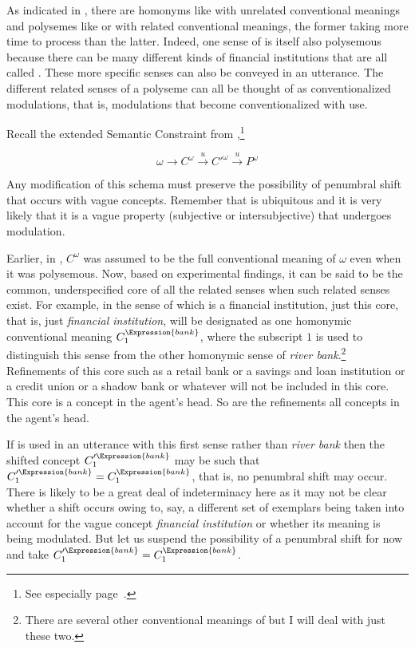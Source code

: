 As indicated in , there are homonyms like  with unrelated conventional meanings and polysemes like  or  with related conventional meanings, the former taking more time to process than the latter. Indeed, one sense of  is itself also polysemous because there can be many different kinds of financial institutions that are all called . These more specific senses can also be conveyed in an utterance. The different related senses of a polyseme can all be thought of as conventionalized modulations, that is, modulations that become conventionalized with use.

Recall the extended Semantic Constraint from ,\footnote{See especially page~\pageref{page:vague communication}.}


\[ \omega \longrightarrow C^{\omega} \stackrel{u}\longrightarrow C'^{\omega} \stackrel{u}\longrightarrow P^\omega \]

Any modification of this schema must preserve the possibility of penumbral shift that occurs with vague concepts. Remember that  is ubiquitous and it is very likely that it is a vague property (subjective or intersubjective) that undergoes modulation. 

Earlier, in , $C^{\omega}$ was assumed to be the full conventional meaning of $\omega$ even when it was polysemous. Now, based on  experimental findings, it can be said to be the common, underspecified core of all the related senses when such related senses exist. For example, in the sense of  which is a financial institution, just this core, that is, just \emph{financial institution}, will be designated as one homonymic conventional meaning $C^{\Expression{bank}}_1$, where the subscript $1$ is used to distinguish this sense from the other homonymic sense of \textit{river bank}.\footnote{There are several other conventional meanings of  but I will deal with just these two.} Refinements of this core such as a retail bank or a savings and loan institution or a credit union or a shadow bank or whatever will not be included in this core. This core is a concept in the agent's head. So are the refinements all concepts in the agent's head.

If  is used in an utterance with this first sense rather than \emph{river bank} then the shifted concept $C'^{\Expression{bank}}_1$ may be such that $C'^{\Expression{bank}}_1 = C^{\Expression{bank}}_1$, that is, no penumbral shift may occur. There is likely to be a great deal of indeterminacy here as it may not be clear whether a shift occurs owing to, say, a different set of exemplars being taken into account for the vague concept \emph{financial institution} or whether its meaning is being modulated. But let us suspend the possibility of a penumbral shift for now and take $C'^{\Expression{bank}}_1 = C^{\Expression{bank}}_1$.

